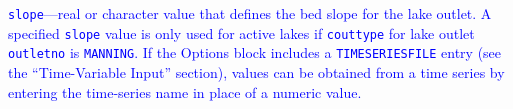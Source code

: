 \begin{description}
\item \textcolor{blue}{\texttt{slope}---real or character value that defines the bed slope for the lake outlet. A specified \texttt{slope} value is only used for active lakes if \texttt{couttype} for lake outlet \texttt{outletno} is \texttt{MANNING}. If the Options block includes a \texttt{TIMESERIESFILE} entry (see the ``Time-Variable Input'' section), values can be obtained from a time series by entering the time-series name in place of a numeric value.}

\end{description}

